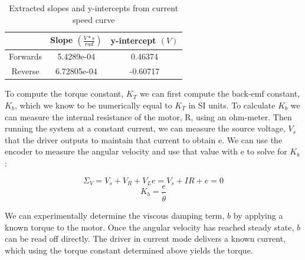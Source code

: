 \documentclass{article}
\theoremstyle{plain}
\theoremstyle{definition}
\theoremstyle{remark}
\begin{document}
\begin{table}[htb]
\begin{center}
    \begin{tabular}{|c|c|c|}
        \hline
        ~        & Slope $\left( \frac{V * s}{rad} \right) $ & y-intercept $ \left( V \right) $ \\ \hline
        Forwards & 5.4289e-04                                & 0.46374                          \\ 
        Reverse  & 6.72805e-04                               & -0.60717                         \\
        \hline
    \end{tabular}
\end{center}
\caption{Extracted slopes and y-intercepts from current speed curve}
\label{q2_b5}
\end{table}

To compute the torque constant, $K_{T}$ we can first compute the back-emf constant, $K_b$, which we know to be numerically equal to $K_T$ in SI units.  To calculate $K_b$ we can measure the internal resistance of the motor, R, using an ohm-meter.  Then running the system at a constant current, we can measure the source voltage, $V_{s}$ that the driver outputs to maintain that current  to obtain e. We can use the encoder to measure the angular velocity and use that value with e to solve for $K_b$:

$$ \Sigma_{V} = V_{s} + V_{R} + V_{L} e = V_{s} + IR + e = 0 $$
$$ K_b = \frac{e}{\dot{\theta}} $$

%
%

We can experimentally determine the viscous damping term, $b$ by applying a known torque to the motor.  Once the angular velocity has reached steady state, $b$ can be read off directly.  The driver in current mode delivers a known current, which using the torque constant determined above yields the torque.  
\end{document}

